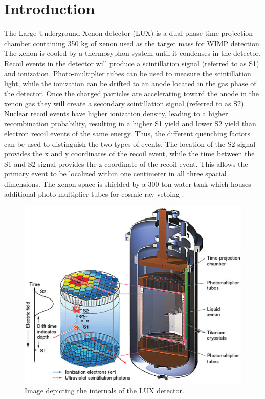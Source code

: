 \section{Introduction}

The Large Underground Xenon detector (LUX) is a dual phase time projection chamber containing 350 kg of xenon used as the target mass for WIMP detection. The xenon is cooled by a thermosyphon system until it condenses in the detector.  Recoil events in the detector will produce a scintillation signal (referred to as S1) and ionization.  Photo-multiplier tubes can be used to measure the scintillation light, while the ionization can be drifted to an anode located in the gas phase of the detector.  Once the charged particles are accelerating toward the anode in the xenon gas they will create a secondary scintillation signal (referred to as S2).  Nuclear recoil events have higher ionization density, leading to a higher recombination probability, resulting in a higher S1 yield and lower S2 yield than electron recoil events of the same energy. Thus, the different quenching factors can be used to distinguish the two types of events.  The location of the S2 signal provides the x and y coordinates of the recoil event, while the time between the S1 and S2 signal provides the z coordinate of the recoil event.  This allows the primary event to be localized within one centimeter in all three spacial dimensions.  The xenon space is shielded by a 300 ton water tank which houses additional photo-multiplier tubes for cosmic ray vetoing \cite{McKinsey,Fiorucci}.

\begin{figure}[H]
\centering
\includegraphics[scale=0.25]{lux.jpg}
\caption{Image depicting the internals of the LUX detector.}
\label{fig:LUX}
\end{figure}

